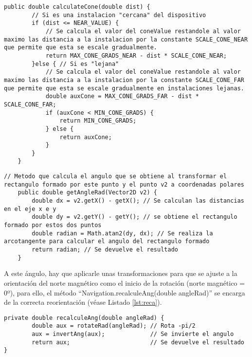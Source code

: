 \begin{lstlisting}[caption={Código para calcular el \textit{coneValue} de identificación de cada instalación.}, label={lst:calculateCone}]
    public double calculateCone(double dist) {
        // Si es una instalacion "cercana" del dispositivo
        if (dist <= NEAR_VALUE) {
            // Se calcula el valor del coneValue restandole al valor maximo las distancia a la instalacion por la constante SCALE_CONE_NEAR que permite que esta se escale gradualmente.
            return MAX_CONE_GRADS_NEAR - dist * SCALE_CONE_NEAR;
        }else { // Si es "lejana"
            // Se calcula el valor del coneValue restandole al valor maximo las distancia a la instalacion por la constante SCALE_CONE_FAR que permite que esta se escale gradualmente en instalaciones lejanas.
            double auxCone = MAX_CONE_GRADS_FAR - dist * SCALE_CONE_FAR;
            if (auxCone < MIN_CONE_GRADS) {
                return MIN_CONE_GRADS;
            } else {
                return auxCone;
            }
        }
    }
\end{lstlisting}


\begin{lstlisting}[caption={Método que calcula el ángulo formado por dos puntos.}, label={lst:angle}]
    // Metodo que calcula el angulo que se obtiene al transformar el rectangulo formado por este punto y el punto v2 a coordenadas polares
    public double getAngleRad(Vector2D v2) {
        double dx = v2.getX() - getX(); // Se calculan las distancias en el eje x e y
        double dy = v2.getY() - getY(); // se obtiene el rectangulo formado por estos dos puntos
        double radian = Math.atan2(dy, dx); // Se realiza la arcotangente para calcular el angulo del rectangulo formado
        return radian; // Se devuelve el resultado
    }
\end{lstlisting}

A este ángulo, hay que aplicarle unas transformaciones para que se ajuste a la orientación del norte magnético como el inicio de la rotación (norte magnético = 0º), para ello, el método ``Navigation.recalculeAng(double angleRad)'' se encarga de la correcta reorientación (véase Listado \ref{lst:reca}). 

\begin{lstlisting}[caption={Método que recalcula en ángulo para orientarlo en función del norte magnético.}, label={lst:reca}]
    private double recalculeAng(double angleRad) {
        double aux = rotateRad(angleRad); // Rota -pi/2
        aux = invertAng(aux);             // Se invierte el angulo 
        return aux;                       // Se devuelve el resultado
}   
\end{lstlisting}

